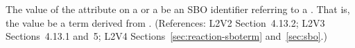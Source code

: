 The value of the  attribute on a \SpeciesReference or a
\ModifierSpeciesReference {} be an SBO identifier referring to a
.  That is, the value  be a term derived
from \changed{\sboparticipantrole}.     (References: 
L2V2 Section~4.13.2; L2V3 Sections~4.13.1 and~5; L2V4 Sections~\ref{sec:reaction-sboterm} and~\ref{sec:sbo}.)
